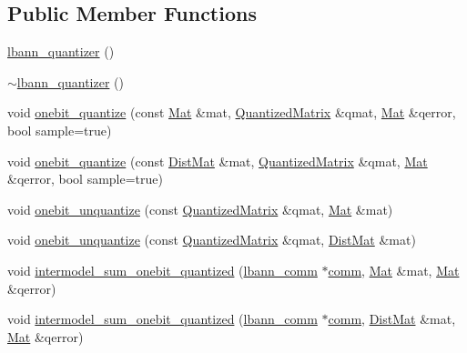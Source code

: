 \subsection*{Public Member Functions}
\begin{DoxyCompactItemize}
\item 
\hyperlink{classlbann_1_1lbann__quantizer_a430cd47f333c678d2cb77f4ab2693914}{lbann\+\_\+quantizer} ()
\item 
\hyperlink{classlbann_1_1lbann__quantizer_ac0cc07008ff963949c2cb7b91786c61c}{$\sim$lbann\+\_\+quantizer} ()
\item 
void \hyperlink{classlbann_1_1lbann__quantizer_a4dd4696cbbfd93c73e5fb3c40fcb16c3}{onebit\+\_\+quantize} (const \hyperlink{base_8hpp_a68f11fdc31b62516cb310831bbe54d73}{Mat} \&mat, \hyperlink{classlbann_1_1lbann__quantizer_a399f3f8c393b6021b43e95d1ce6ea28c}{Quantized\+Matrix} \&qmat, \hyperlink{base_8hpp_a68f11fdc31b62516cb310831bbe54d73}{Mat} \&qerror, bool sample=true)
\item 
void \hyperlink{classlbann_1_1lbann__quantizer_a9eeb89150026bf4b7bea15bffdba10d3}{onebit\+\_\+quantize} (const \hyperlink{base_8hpp_a0fab5387556805cfeac3e7e567bf66c5}{Dist\+Mat} \&mat, \hyperlink{classlbann_1_1lbann__quantizer_a399f3f8c393b6021b43e95d1ce6ea28c}{Quantized\+Matrix} \&qmat, \hyperlink{base_8hpp_a68f11fdc31b62516cb310831bbe54d73}{Mat} \&qerror, bool sample=true)
\item 
void \hyperlink{classlbann_1_1lbann__quantizer_ad5592daa122b40c275cce3dc93bba41e}{onebit\+\_\+unquantize} (const \hyperlink{classlbann_1_1lbann__quantizer_a399f3f8c393b6021b43e95d1ce6ea28c}{Quantized\+Matrix} \&qmat, \hyperlink{base_8hpp_a68f11fdc31b62516cb310831bbe54d73}{Mat} \&mat)
\item 
void \hyperlink{classlbann_1_1lbann__quantizer_afc7a47fb5a5e87a09f2913a46a2bacf7}{onebit\+\_\+unquantize} (const \hyperlink{classlbann_1_1lbann__quantizer_a399f3f8c393b6021b43e95d1ce6ea28c}{Quantized\+Matrix} \&qmat, \hyperlink{base_8hpp_a0fab5387556805cfeac3e7e567bf66c5}{Dist\+Mat} \&mat)
\item 
void \hyperlink{classlbann_1_1lbann__quantizer_a4b326de1ca5b7eba6415b6f42f83335b}{intermodel\+\_\+sum\+\_\+onebit\+\_\+quantized} (\hyperlink{classlbann_1_1lbann__comm}{lbann\+\_\+comm} $\ast$\hyperlink{file__io_8cpp_ab048c6f9fcbcfaa57ce68b00263dbebe}{comm}, \hyperlink{base_8hpp_a68f11fdc31b62516cb310831bbe54d73}{Mat} \&mat, \hyperlink{base_8hpp_a68f11fdc31b62516cb310831bbe54d73}{Mat} \&qerror)
\item 
void \hyperlink{classlbann_1_1lbann__quantizer_af24e00e26e157f102f3cef547de40ae1}{intermodel\+\_\+sum\+\_\+onebit\+\_\+quantized} (\hyperlink{classlbann_1_1lbann__comm}{lbann\+\_\+comm} $\ast$\hyperlink{file__io_8cpp_ab048c6f9fcbcfaa57ce68b00263dbebe}{comm}, \hyperlink{base_8hpp_a0fab5387556805cfeac3e7e567bf66c5}{Dist\+Mat} \&mat, \hyperlink{base_8hpp_a68f11fdc31b62516cb310831bbe54d73}{Mat} \&qerror)

\end{DoxyCompactItemize}
